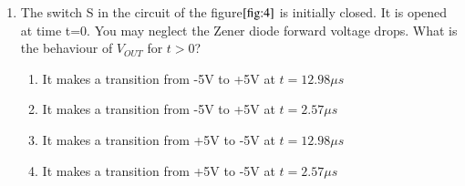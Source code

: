 \documentclass[journal]{IEEEtran}
\numberwithin{equation}{enumi}
\numberwithin{figure}{enumi}
\begin{document}
\begin{enumerate}
\begin{enumerate}
\end{enumerate}
\bigskip
\item The switch S in the circuit of the figure$\ref{fig:4}$ is initially closed. It is opened at time t=0. You may neglect the Zener diode forward voltage drops. What is the behaviour of $V_{OUT}$ for $t>0$? 
\begin{figure}[!ht]
    
			\centering
			
			\caption{}
			\label{fig:4}
		\end{figure}

\begin{enumerate}
    \item It makes a transition from -5V to +5V at $t=12.98\mu s$
    \item It makes a transition from -5V to +5V at $t=2.57\mu s$
    \item It makes a transition from +5V to -5V at $t=12.98\mu s$
    \item It makes a transition from +5V to -5V at $t=2.57\mu s$


\end{enumerate}
\end{enumerate}
\end{document}
